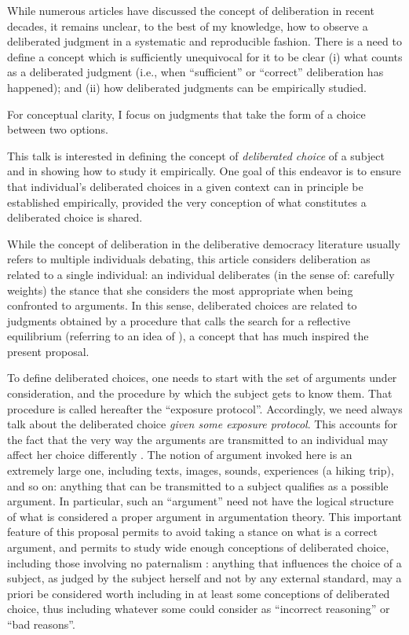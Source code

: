 \documentclass[version=last, pagesize, twoside=off, bibliography=totoc, DIV=calc, fontsize=12pt, a4paper, french, english]{scrartcl}
\begin{document}
While numerous articles have discussed the concept of deliberation in recent decades, it remains unclear, to the best of my knowledge, how to observe a deliberated judgment in a systematic and reproducible fashion. 
There is a need to define a concept which is sufficiently unequivocal for it to be clear 
(i) what counts as a deliberated judgment (i.e., when “sufficient” \citep{meinard_justification_2020} or “correct” deliberation has happened); 
and (ii) how deliberated judgments can be empirically studied.

For conceptual clarity, I focus on judgments that take the form of a choice between two options.

This talk is interested in defining the concept of \emph{deliberated choice} of a subject and in showing how to study it empirically.
One goal of this endeavor is to ensure that individual’s deliberated choices in a given context can in principle be established empirically, provided the very conception of what constitutes a deliberated choice is shared.

While the concept of deliberation in the deliberative democracy literature usually refers to multiple individuals debating, this article considers deliberation as related to a single individual: an individual deliberates (in the sense of: carefully weights) the stance that she considers the most appropriate when being confronted to arguments. In this sense, deliberated choices are related to judgments obtained by a procedure that \citet{rawls_theory_1999} calls the search for a reflective equilibrium (referring to an idea of \citet{goodman_fact_1983}), a concept that has much inspired the present proposal.

To define deliberated choices, one needs to start with the set of arguments under consideration, and the procedure by which the subject gets to know them. That procedure is called hereafter the “exposure protocol”.
Accordingly, we need always talk about the deliberated choice \emph{given some exposure protocol}. 
This accounts for the fact that the very way the arguments are transmitted to an individual may affect her choice differently \citep{railton_facts_2003}. 
The notion of argument invoked here is an extremely large one, including texts, images, sounds, experiences (a hiking trip), and so on: anything that can be transmitted to a subject qualifies as a possible argument. In particular, such an “argument” need not have the logical structure of what is considered a proper argument in argumentation theory. This important feature of this proposal permits to avoid taking a stance on what is a correct argument, and permits to study wide enough conceptions of deliberated choice, including those involving no paternalism \citep{cailloux_formal_2020}: anything that influences the choice of a subject, as judged by the subject herself and not by any external standard, may a priori be considered worth including in at least some conceptions of deliberated choice, thus including whatever some could consider as “incorrect reasoning” or “bad reasons”.
\end{document}
